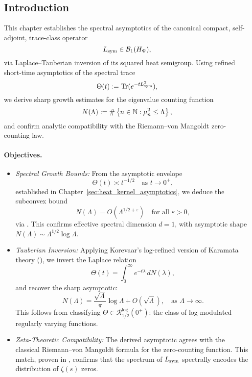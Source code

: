 \subsection*{Introduction}
\label{sec:intro_tauberian_growth}

This chapter establishes the spectral asymptotics of the canonical compact, self-adjoint, trace-class operator
\[
L_{\mathrm{sym}} \in \mathcal{B}_1(H_{\Psi}),
\]
via Laplace–Tauberian inversion of its squared heat semigroup. Using refined short-time asymptotics of the spectral trace
\[
\Theta(t) := \operatorname{Tr}(e^{-t L_{\mathrm{sym}}^2}),
\]
we derive sharp growth estimates for the eigenvalue counting function
\[
N(\Lambda) := \#\left\{ n \in \mathbb{N} : \mu_n^2 \le \Lambda \right\},
\]
and confirm analytic compatibility with the Riemann–von Mangoldt zero-counting law.

\paragraph{Objectives.}
\begin{itemize}
  \item \textit{Spectral Growth Bounds:}  
  From the asymptotic envelope
  \[
  \Theta(t) \asymp t^{-1/2} \quad \text{as } t \to 0^+,
  \]
  established in Chapter~\ref{sec:heat_kernel_asymptotics}, we deduce the subconvex bound
  \[
  N(\Lambda) = O(\Lambda^{1/2+\varepsilon}) \quad \text{for all } \varepsilon > 0,
  \]
  via . This confirms effective spectral dimension \( d = 1 \), with asymptotic shape \( N(\Lambda) \sim \Lambda^{1/2} \log \Lambda \).

  \item \textit{Tauberian Inversion:}  
  Applying Korevaar’s log-refined version of Karamata theory (), we invert the Laplace relation
  \[
  \Theta(t) = \int_0^\infty e^{-t\lambda} \, dN(\lambda),
  \]
  and recover the sharp asymptotic:
  \[
  N(\Lambda) = \frac{\sqrt{\Lambda}}{\pi} \log \Lambda + O(\sqrt{\Lambda}),
  \quad \text{as } \Lambda \to \infty.
  \]
  This follows from classifying \( \Theta \in \mathcal{R}_{1/2}^{\log}(0^+) \): the class of log-modulated regularly varying functions.

  \item \textit{Zeta-Theoretic Compatibility:}  
  The derived asymptotic agrees with the classical Riemann–von Mangoldt formula for the zero-counting function. This match, proven in , confirms that the spectrum of \( L_{\mathrm{sym}} \) spectrally encodes the distribution of \( \zeta(s) \) zeros.
\end{itemize}

